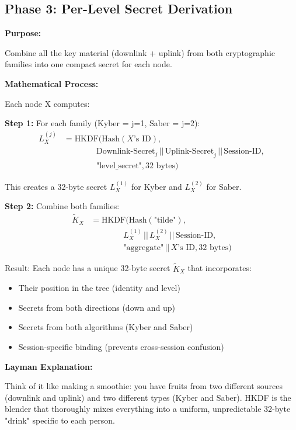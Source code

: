 \documentclass[12pt,a4paper]{report}
\begin{document}
\subsection{Phase 3: Per-Level Secret Derivation}

\textbf{Purpose:}

Combine all the key material (downlink + uplink) from both cryptographic families into one compact secret for each node.

\textbf{Mathematical Process:}

Each node X computes:

\textbf{Step 1:} For each family (Kyber = j=1, Saber = j=2):
\begin{align*}
L_X^{(j)} &= \text{HKDF}(\text{Hash}(X\text{'s ID}), \\
&\quad\quad\quad\quad \text{Downlink-Secret}_j \,||\, \text{Uplink-Secret}_j \,||\, \text{Session-ID}, \\
&\quad\quad\quad\quad \text{"level\_secret"}, 32 \text{ bytes})
\end{align*}

This creates a 32-byte secret $L_X^{(1)}$ for Kyber and $L_X^{(2)}$ for Saber.

\textbf{Step 2:} Combine both families:
\begin{align*}
\widetilde{K}_X &= \text{HKDF}(\text{Hash}(\text{"tilde"}), \\
&\quad\quad\quad\quad L_X^{(1)} \,||\, L_X^{(2)} \,||\, \text{Session-ID}, \\
&\quad\quad\quad\quad \text{"aggregate"} \,||\, X\text{'s ID}, 32 \text{ bytes})
\end{align*}

Result: Each node has a unique 32-byte secret $\widetilde{K}_X$ that incorporates:
\begin{itemize}
\item Their position in the tree (identity and level)
\item Secrets from both directions (down and up)
\item Secrets from both algorithms (Kyber and Saber)
\item Session-specific binding (prevents cross-session confusion)
\end{itemize}

\textbf{Layman Explanation:}

Think of it like making a smoothie: you have fruits from two different sources (downlink and uplink) and two different types (Kyber and Saber). HKDF is the blender that thoroughly mixes everything into a uniform, unpredictable 32-byte "drink" specific to each person.
\end{document}
